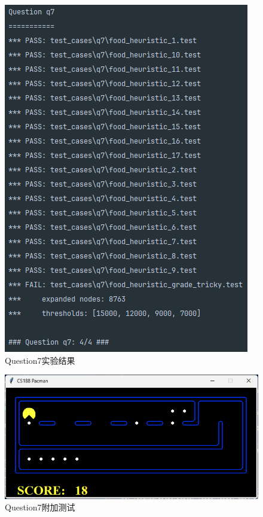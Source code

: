 \begin{figure}[htbp]
    \centering
    \includegraphics[scale = 0.7]{pic/q7.png}
    \caption{Question7实验结果}\label{q7}
\end{figure}

\begin{figure}[htbp]
    \centering
    \includegraphics[scale = 0.7]{pic/q7t.png}
    \caption{Question7附加测试}\label{q7t}
\end{figure}
